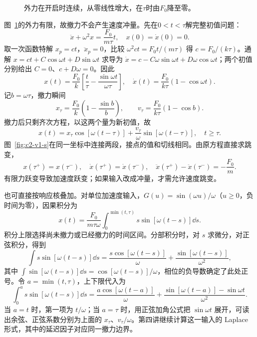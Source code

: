 \begin{figure}[H]\centering
{}
\caption{外力在开启时连续，从零线性增大，在$\tau$时由$F_0$降至零。}\label{fig:c2-v1-q}
\end{figure}
\begin{solution}
图~\ref{fig:c2-v1-q}的外力有限，故撤力不会产生速度冲量。先在$0<t<\tau$解完整初值问题：
\[\ddot x+\omega^2x=\frac{F_0}{m\tau}t,
\quad x(0)=\dot x(0)=0.\]
取一次函数特解 $x_p=ct$，$\ddot x_p=0$，比较 $\omega^2ct=F_0t/(m\tau)$ 得 $c=F_0/(k\tau)$。通解 $x=ct+C\cos\omega t+D\sin\omega t$ 求导为 $\dot x=c-C\omega\sin\omega t+D\omega\cos\omega t$；两个初值分别给出 $C=0$、$c+D\omega=0$。因此
\[x(t)=\frac{F_0}{k}\left[\frac t\tau-\frac{\sin\omega t}{\omega\tau}\right],
\quad\dot x(t)=\frac{F_0}{k\tau}(1-\cos\omega t).\]
记$b=\omega\tau$，撤力瞬间
\[x_\tau=\frac{F_0}{k}\left(1-\frac{\sin b}{b}\right),\qquad
v_\tau=\frac{F_0}{k\tau}(1-\cos b).\]
撤力后只剩齐次方程，以这两个量为新初值，故
\[\boxed{x(t)=x_\tau\cos[\omega(t-\tau)]
+\frac{v_\tau}{\omega}\sin[\omega(t-\tau)]},\quad t\ge\tau.\]
图~\ref{fig:c2-v1-s}在同一坐标中连接两段，接点的值和切线相同。由原方程直接求跳变，
\[x(\tau^+)=x(\tau^-),\quad
\dot x(\tau^+)=\dot x(\tau^-),\quad
\ddot x(\tau^+)-\ddot x(\tau^-)=-\frac{F_0}{m}.\]
有限力跃变导致加速度跃变；如果输入改成冲量，才需允许速度跳变。

也可直接按响应核叠加。对单位加速度输入，$G(u)=\sin(\omega u)/\omega$（$u\ge0$，负时间为零），因果积分为
\[x(t)=\frac{F_0}{m\tau\omega}
\int_0^{\min(t,\tau)}s\sin[\omega(t-s)]\dd s.\]
积分上限选择尚未撤力或已经撤力的时间区间。分部积分时，对 $s$ 求微分，对正弦积分，得到
\[\int s\sin[\omega(t-s)]\dd s
=\frac{s\cos[\omega(t-s)]}{\omega}
+\frac{\sin[\omega(t-s)]}{\omega^2},\]
其中 $\int\sin[\omega(t-s)]\dd s=\cos[\omega(t-s)]/\omega$，相位的负导数确定了此处正号。令 $a=\min(t,\tau)$，上下限代入为
\[
\int_0^as\sin[\omega(t-s)]\dd s
=\frac{a\cos[\omega(t-a)]}{\omega}
+\frac{\sin[\omega(t-a)]-\sin\omega t}{\omega^2}.
\]
当 $a=t$ 时，第一项为 $t/\omega$；当 $a=\tau$ 时，用正弦加角公式把 $\sin\omega t$ 展开，可读出余弦、正弦系数分别为上面的 $x_\tau$、$v_\tau/\omega$。第四讲继续计算这一输入的 Laplace 形式，其中的延迟因子对应同一撤力边界。
\begin{figure}[H]\centering
\begin{tikzpicture}[>=Stealth,line cap=round,line join=round]


\end{tikzpicture}
\end{figure}
\end{solution}
